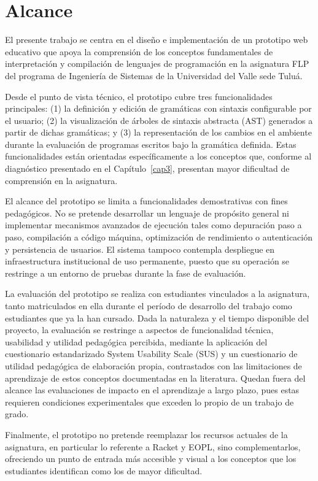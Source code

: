 \section{Alcance}

El presente trabajo se centra en el diseño e implementación de un prototipo web educativo que apoya la comprensión de los conceptos fundamentales de interpretación y compilación de lenguajes de programación en la asignatura FLP del programa de Ingeniería de Sistemas de la Universidad del Valle sede Tuluá.

Desde el punto de vista técnico, el prototipo cubre tres funcionalidades principales: (1) la definición y edición de gramáticas con sintaxis configurable por el usuario; (2) la visualización de árboles de sintaxis abstracta (AST) generados a partir de dichas gramáticas; y (3) la representación de los cambios en el ambiente durante la evaluación de programas escritos bajo la gramática definida. Estas funcionalidades están orientadas específicamente a los conceptos que, conforme al diagnóstico presentado en el Capítulo~\ref{cap3}, presentan mayor dificultad de comprensión en la asignatura.

El alcance del prototipo se limita a funcionalidades demostrativas con fines pedagógicos. No se pretende desarrollar un lenguaje de propósito general ni implementar mecanismos avanzados de ejecución tales como depuración paso a paso, compilación a código máquina, optimización de rendimiento o autenticación y persistencia de usuarios. El sistema tampoco contempla despliegue en infraestructura institucional de uso permanente, puesto que su operación se restringe a un entorno de pruebas durante la fase de evaluación.

La evaluación del prototipo se realiza con estudiantes vinculados a la asignatura, tanto matriculados en ella durante el período de desarrollo del trabajo como estudiantes que ya la han cursado. Dada la naturaleza y el tiempo disponible del proyecto, la evaluación se restringe a aspectos de funcionalidad técnica, usabilidad y utilidad pedagógica percibida, mediante la aplicación del cuestionario estandarizado System Usability Scale (SUS) y un cuestionario de utilidad pedagógica de elaboración propia, contrastados con las limitaciones de aprendizaje de estos conceptos documentadas en la literatura. Quedan fuera del alcance las evaluaciones de impacto en el aprendizaje a largo plazo, pues estas requieren condiciones experimentales que exceden lo propio de un trabajo de grado.

Finalmente, el prototipo no pretende reemplazar los recursos actuales de la asignatura, en particular lo referente a Racket y EOPL, sino complementarlos, ofreciendo un punto de entrada más accesible y visual a los conceptos que los estudiantes identifican como los de mayor dificultad.